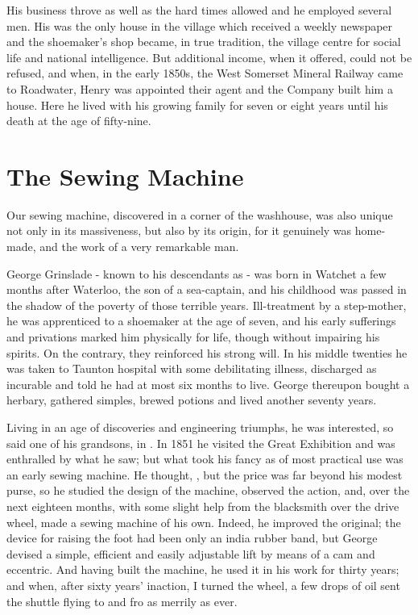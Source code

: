 His business throve as well as the hard times allowed and he employed several men. His was the only house in the village	which received	a weekly newspaper and the shoemaker's shop became, in true tradition, the village centre for social life and national intelligence. But additional income, when it offered, could not be refused, and when, in the early 1850s, the West Somerset Mineral Railway came to Roadwater, Henry was appointed their agent and the Company built him a house. Here he lived with his growing family for seven or eight years until his death at the age of fifty-nine.
 
\section{The Sewing Machine}  
 
Our sewing machine, discovered in a corner of	the washhouse,	was also unique not only in its massiveness, but	also by its	origin, for it	genuinely was home-made, and the work of a very remarkable man.

George Grinslade - known to his descendants as  - was born in Watchet a few months after Waterloo, the son of a sea-captain, and his childhood was passed in the shadow of the poverty of those terrible years. Ill-treatment by a step-mother, he was apprenticed to a shoemaker at the age of seven, and his early sufferings and privations marked him physically for life, though without impairing his spirits. On the contrary, they reinforced his strong will. In his middle twenties he was taken to Taunton hospital with some debilitating illness, discharged as incurable and told he had at most six months to live. George thereupon bought a herbary, gathered simples, brewed potions and lived another seventy years.

Living in an age of discoveries and engineering triumphs, he was interested, so said one of his grandsons, in . In 1851 he visited the Great Exhibition and was enthralled by what he saw; but what took his fancy as of most practical use was an early sewing machine. He thought, , but the price was far beyond his modest purse, so he studied the design of the machine, observed the action, and, over the next eighteen months, with some slight help from the blacksmith over the drive wheel, made a sewing machine of his own. Indeed, he improved the original; the device for raising the foot had been only an india rubber band, but George devised a simple, efficient and easily adjustable lift by means of a cam and eccentric. And having built the machine, he used it in his work for thirty years; and when, after sixty years’ inaction, I turned the wheel, a few drops of oil sent the shuttle flying to and fro as merrily as ever.

